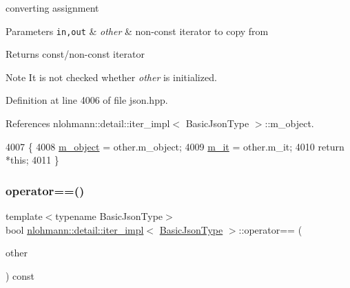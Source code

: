 converting assignment 


\begin{DoxyParams}[1]{Parameters}
\mbox{\tt in,out}  & {\em other} & non-\/const iterator to copy from \\
\hline
\end{DoxyParams}
\begin{DoxyReturn}{Returns}
const/non-\/const iterator 
\end{DoxyReturn}
\begin{DoxyNote}{Note}
It is not checked whether {\itshape other} is initialized. 
\end{DoxyNote}


Definition at line 4006 of file json.\+hpp.



References nlohmann\+::detail\+::iter\+\_\+impl$<$ Basic\+Json\+Type $>$\+::m\+\_\+object.


\begin{DoxyCode}
4007     \{
4008         \hyperlink{classnlohmann_1_1detail_1_1iter__impl_aca84f84be598bdfaaddd23d928c42bbb}{m\_object} = other.m\_object;
4009         \hyperlink{classnlohmann_1_1detail_1_1iter__impl_a8a86a7c0d4af0cc4ab345b6f0e13cdfa}{m\_it} = other.m\_it;
4010         \textcolor{keywordflow}{return} *\textcolor{keyword}{this};
4011     \}
\end{DoxyCode}
\mbox{\label{classnlohmann_1_1detail_1_1iter__impl_a2b592605b63ae7f5401996ffa3b14393}} 
\subsubsection{\texorpdfstring{operator==()}{operator==()}}
{\footnotesize\ttfamily template$<$typename Basic\+Json\+Type$>$ \\
bool \hyperlink{classnlohmann_1_1detail_1_1iter__impl}{nlohmann\+::detail\+::iter\+\_\+impl}$<$ \hyperlink{classnlohmann_1_1detail_1_1iter__impl_abf18f18793f84b0222aebb5a2a87da7a}{Basic\+Json\+Type} $>$\+::operator== (\begin{DoxyParamCaption}\item[{const \hyperlink{classnlohmann_1_1detail_1_1iter__impl}{iter\+\_\+impl}$<$ \hyperlink{classnlohmann_1_1detail_1_1iter__impl_abf18f18793f84b0222aebb5a2a87da7a}{Basic\+Json\+Type} $>$ \&}]{other }\end{DoxyParamCaption}) const\hspace{0.3cm}{\ttfamily [inline]}}



